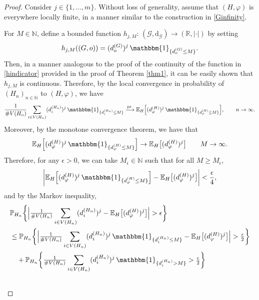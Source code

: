 \documentclass[10pt,a4paper]{amsart}
\newcommand{\E}{\mathbb E}
\newcommand{\N}{\mathbb N}
\newcommand{\R}{\mathbb R}
\newcommand{\prob}{\overset{\mathrm{pr.}}{\longrightarrow}}
\renewcommand{\P}{\mathbb P}
\begin{document}
\begin{proof}
Consider $j \in \{1, \ldots, m\}$. Without loss of generality, assume that $(H, \varphi)$ is everywhere locally finite, in a manner similar to the construction in \eqref{Ginfinity}. 

For $M \in \N$, define a bounded function $h_{j,M}\colon\,(\mathscr{G},\mathrm{d}_{\mathscr{G}}) \to (\R,\vert\cdot\vert)$ by setting
\begin{align*}
h_{j,M}((G,o))=(d^{(G)}_{o})^{j}\,\mathbbm{1}_{\{d^{(G)}_{o}\leq M\}}.
\end{align*}
Then, in a manner analogous to the proof of the continuity of the function in \eqref{hindicator} provided in the proof of Theorem \ref{thm1}, it can be easily shown that $h_{j,M}$ is continuous. Therefore, by the local convergence in probability of $(H_{n})_{n\in\N}$ to $(H, \varphi)$, we have
\begin{align}\label{lem1}
\frac{1}{\#V(H_{n})}\sum_{i\in V(H_{n})}(d_{i}^{(H_{n})})^{j}\,\mathbbm{1}_{\{d_{i}^{(H_{n})}\leq M\}}\prob \E_{H}\Big[(d_{\varphi}^{(H)})^{j}\,\mathbbm{1}_{\{d_{\varphi}^{(H)}\leq M\}}\Big],\qquad n\to\infty .
\end{align}
Moreover, by the monotone convergence theorem, we have that
\begin{align*}
\E_{H}\Big[(d_{\varphi}^{(H)})^{j}\,\mathbbm{1}_{\{d_{\varphi}^{(H)}\leq M\}}\Big]\to\E_{H}\big[(d_{\varphi}^{(H)})^{j}\big]\qquad M\to\infty .
\end{align*}
Therefore, for any $\epsilon >0$, we can take $M_{\epsilon}\in\N$ such that for all $M\geq M_{\epsilon}$,
\begin{align*}
\bigg|\E_{H}\Big[(d_{\varphi}^{(H)})^{j}\,\mathbbm{1}_{\{d_{\varphi}^{(H)}\leq M\}}\Big]-\E_{H}\big[(d_{\varphi}^{(H)})^{j}\big]\bigg|<\frac{\epsilon}{4},
\end{align*}
and by the Markov inequality,
\begin{align*}
&\P_{H_{n}}\bigg\{\Big |\tfrac{1}{\#V(H_{n})}\sum_{i\in V(H_{n})}(d_{i}^{(H_{n})})^{j}-\E_{H}\big[(d_{\varphi}^{(H)})^{j}\big]\Big |>\epsilon\bigg\}
\\&\leq \P_{H_{n}}\bigg\{\Big |\tfrac{1}{\#V(H_{n})}\sum_{i\in V(H_{n})}(d_{i}^{(H_{n})})^{j}\,\mathbbm{1}_{\{d_{i}^{(H_{n})}\leq M\}}-\E_{H}\big[(d_{\varphi}^{(H)})^{j}\big]\Big|>\tfrac{\epsilon}{2}\bigg\}\\&\quad
+\P_{H_{n}}\bigg\{\tfrac{1}{\#V(H_{n})}\sum_{i\in V(H_{n})}(d_{i}^{(H_{n})})^{j}\,\mathbbm{1}_{\{d_{i}^{(H_{n})}> M\}}>\tfrac{\epsilon}{2}\bigg\}\\&

\end{align*}
\end{proof}
\end{document}
